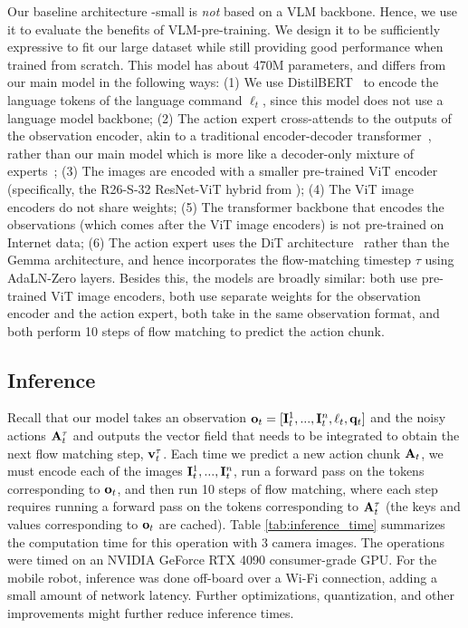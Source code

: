 Our baseline architecture \ModelSymbol-small is \emph{not} based on a VLM backbone. Hence, we use it to evaluate the benefits of VLM-pre-training.
We design it to be sufficiently expressive to fit our large dataset while still providing good performance when trained from scratch. This model has about 470M parameters, and differs from our main model in the following ways: (1) We use DistilBERT~\citep{sanh2019distilbert} to encode the language tokens of the language command $\ell_t$, since this model does not use a language model backbone; (2) The action expert cross-attends to the outputs of the observation encoder, akin to a traditional encoder-decoder transformer~\citep{vaswani2017attention}, rather than our main model which is more like a decoder-only mixture of experts~\citep{shazeer2017outrageously}; (3) The images are encoded with a smaller pre-trained ViT encoder (specifically, the R26-S-32 ResNet-ViT hybrid from \citet{steiner2022trainvitdataaugmentation}); (4) The ViT image encoders do not share weights; (5) The transformer backbone that encodes the observations (which comes after the ViT image encoders) is not pre-trained on Internet data; (6) The action expert uses the DiT architecture~\citep{peebles2023scalable} rather than the Gemma architecture, and hence incorporates the flow-matching timestep $\tau$ using AdaLN-Zero layers. Besides this, the models are broadly similar: both use pre-trained ViT image encoders, both use separate weights for the observation encoder and the action expert, both take in the same observation format, and both perform 10 steps of flow matching to predict the action chunk.

\subsection{Inference}
\label{app:inference}

Recall that our model takes an observation $\mathbf{o}_t = [\mathbf{I}^1_t , ... , \mathbf{I}^n_t, \ell_t, \mathbf{q}_t]$ and the noisy actions $\mathbf{A}_t^\tau$ and outputs the vector field that needs to be integrated to obtain the next flow matching step, $\mathbf{v}_t^\tau$. Each time we predict a new action chunk $\mathbf{A}_t$, we must encode each of the images $\mathbf{I}^1_t , ... , \mathbf{I}^n_t$, run a forward pass on the tokens corresponding to $\mathbf{o}_t$, and then run 10 steps of flow matching, where each step requires running a forward pass on the tokens corresponding to $\mathbf{A}_t^\tau$ (the keys and values corresponding to $\mathbf{o}_t$ are cached). Table \ref{tab:inference_time} summarizes the computation time for this operation with 3 camera images. The operations were timed on an NVIDIA GeForce RTX 4090 consumer-grade GPU. For the mobile robot, inference was done off-board over a Wi-Fi connection, adding a small amount of network latency. Further optimizations, quantization, and other improvements might further reduce inference times.

